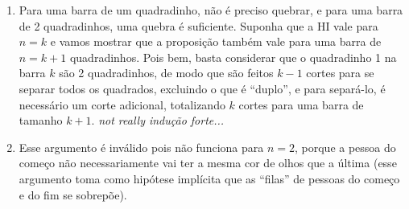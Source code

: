 \documentclass{article}
\begin{document}
\begin{enumerate}
	\item Para uma barra de um quadradinho, não é preciso quebrar, e para uma barra de 2 quadradinhos, uma quebra é suficiente. Suponha que a HI vale para \( n = k \) e vamos mostrar que a proposição também vale para uma barra de \( n = k + 1 \) quadradinhos. Pois bem, basta considerar que o quadradinho 1 na barra \( k \) são 2 quadradinhos, de modo que são feitos \( k - 1 \) cortes para se separar todos os quadrados, excluindo o que é ``duplo'', e para separá-lo, é necessário um corte adicional, totalizando \( k \) cortes para uma barra de tamanho \( k + 1 \). \textit{not really indução forte...}

	\item Esse argumento é inválido pois não funciona para \( n = 2 \), porque a pessoa do começo não necessariamente vai ter a mesma cor de olhos que a última (esse argumento toma como hipótese implícita que as ``filas'' de pessoas do começo e do fim se sobrepõe).

\end{enumerate}
\end{document}
